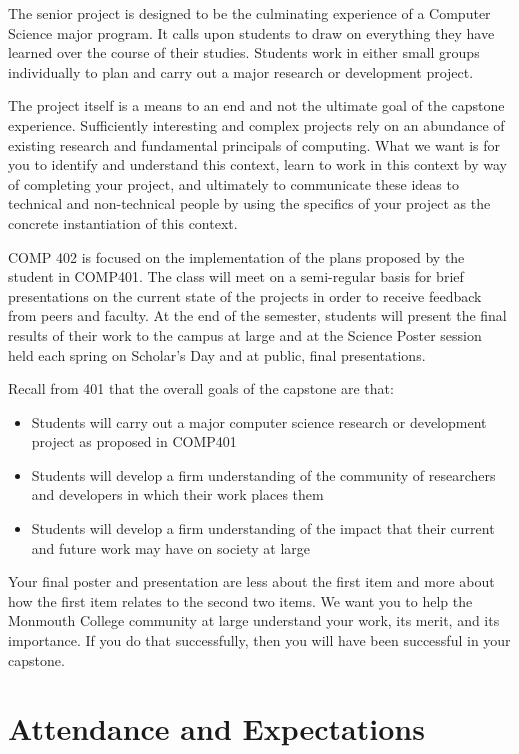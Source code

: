 \documentclass[10pt]{article}
\begin{document}
The senior project is designed to be the culminating experience of a Computer Science major program.  It calls upon students to draw on everything they have learned over the course of their studies. Students work in either small groups individually to plan and carry out a major research or development project.  

The project itself is a means to an end and not the ultimate goal of the capstone experience. Sufficiently interesting and complex projects rely on an abundance of existing research and fundamental principals of computing.  What we want is for you to identify and understand this context, learn to work in this context by way of completing your project, and ultimately to communicate these ideas to technical and non-technical people by using the specifics of your project as the concrete instantiation of this context. 

COMP 402 is focused on the implementation of the plans proposed by the student in COMP401.  The class will meet on a semi-regular basis for  brief presentations on the current state of the projects in order to receive feedback from peers and faculty.  At the end of the semester, students will present the final results of their work to the campus at large and at the Science Poster session held each spring on Scholar's Day and at public, final presentations. 

Recall from 401 that the overall goals of the capstone are that:
\begin{itemize}
\item Students will carry out a major computer science research or development project as proposed in COMP401
\item Students will develop a firm understanding of the community of researchers and developers in which their work places them
\item Students will develop a firm understanding of the impact that their current and future work may  have on society at large 
\end{itemize}
Your final poster  and presentation are less about the first item and more about how the first item relates to the second two items.  We want you to help the Monmouth College community at large understand your work, its merit, and its importance. If you do that successfully, then you will have been successful in your capstone. 


\section{Attendance and Expectations}
\end{document}
